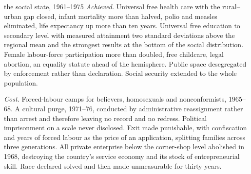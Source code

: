 \begin{ledger}{the social state, 1961--1975}
\emph{Achieved.} Universal free health care with the rural--urban gap closed,
infant mortality more than halved, polio and measles eliminated, life
expectancy up more than ten years. Universal free education to secondary level
with measured attainment two standard deviations above the regional mean and
the strongest results at the bottom of the social distribution. Female
labour-force participation more than doubled, free childcare, legal abortion,
an equality statute ahead of the hemisphere. Public space desegregated by
enforcement rather than declaration. Social security extended to the whole
population.

\emph{Cost.} Forced-labour camps for believers, homosexuals and nonconformists,
1965--68. A cultural purge, 1971--76, conducted by administrative
reassignment rather than arrest and therefore leaving no record and no
redress. Political imprisonment on a scale never disclosed. Exit made
punishable, with confiscation and years of forced labour as the price of an
application, splitting families across three generations. All private
enterprise below the corner-shop level abolished in 1968, destroying the
country's service economy and its stock of entrepreneurial skill. Race declared
solved and then made unmeasurable for thirty years.
\end{ledger}
